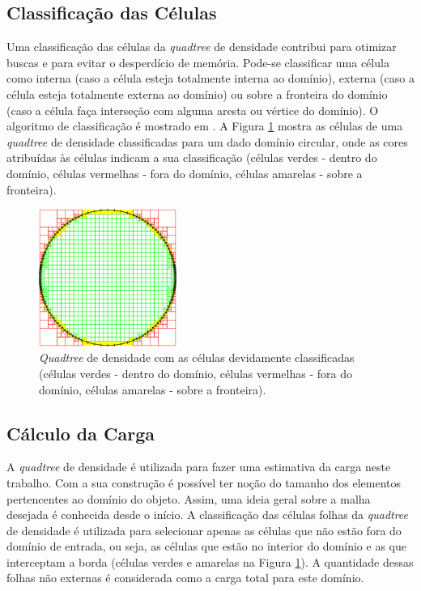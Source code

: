 \subsection{Classificação das Células}

Uma classificação das células da \textit{quadtree} de densidade contribui para otimizar buscas e para evitar o desperdício de memória. Pode-se classificar uma célula como interna (caso a célula esteja totalmente interna ao domínio), externa (caso a célula esteja totalmente externa ao domínio) ou sobre a fronteira do domínio (caso a célula faça interseção com alguma aresta ou vértice do domínio). O algoritmo de classificação é mostrado em \cite{bib:Freitas10}. A Figura \ref{fig:classificacao} mostra as células de uma \textit{quadtree} de densidade classificadas para um dado domínio circular, onde as cores atribuídas às células indicam a sua classificação (células verdes - dentro do domínio, células vermelhas - fora do domínio, células amarelas - sobre a fronteira).

\begin{figure}[!ht]
	\centering
	\includegraphics[width=0.4\textwidth]{fig/classificacao.png}
	\caption{\textit{Quadtree} de densidade com as células devidamente classificadas (células verdes - dentro do domínio, células vermelhas - fora do domínio, células amarelas - sobre a fronteira).}
	\label{fig:classificacao}
\end{figure}


\subsection{Cálculo da Carga}

A \textit{quadtree} de densidade é utilizada para fazer uma estimativa da carga neste trabalho. Com a sua construção é possível ter noção do tamanho dos elementos pertencentes ao domínio do objeto. Assim, uma ideia geral sobre a malha desejada é conhecida desde o início. A classificação das células folhas da \textit{quadtree} de densidade é utilizada para selecionar apenas as células que não estão fora do domínio de entrada, ou seja, as células que estão no interior do domínio e as que interceptam a borda (células verdes e amarelas na Figura \ref{fig:classificacao}). A quantidade dessas folhas não externas é considerada como a carga total para este domínio.


